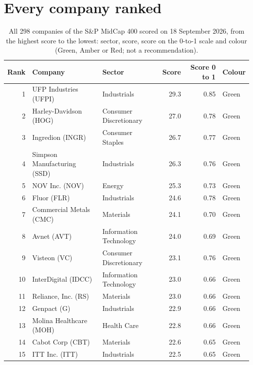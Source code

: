 \documentclass[11pt,a4paper]{article}
\begin{document}
\section{Every company ranked}
\label{app:ranking}
{\small
\begin{longtable}{r p{4.6cm} p{3cm} r r l}
\caption{All 298 companies of the S\&P MidCap 400 scored on 18 September 2026, from the highest score to the lowest: sector, score, score on the 0-to-1 scale and colour (Green, Amber or Red; not a recommendation).}\label{tab:ranking}\\
\hline
Rank & Company & Sector & Score & Score 0 to 1 & Colour \\
\hline
\endhead
1 & UFP Industries (UFPI) & Industrials & 29.3 & 0.85 & \cellcolor[HTML]{C6EFCE}Green \\
2 & Harley-Davidson (HOG) & Consumer Discretionary & 27.0 & 0.78 & \cellcolor[HTML]{C6EFCE}Green \\
3 & Ingredion (INGR) & Consumer Staples & 26.7 & 0.77 & \cellcolor[HTML]{C6EFCE}Green \\
4 & Simpson Manufacturing (SSD) & Industrials & 26.3 & 0.76 & \cellcolor[HTML]{C6EFCE}Green \\
5 & NOV Inc. (NOV) & Energy & 25.3 & 0.73 & \cellcolor[HTML]{C6EFCE}Green \\
6 & Fluor (FLR) & Industrials & 24.6 & 0.78 & \cellcolor[HTML]{C6EFCE}Green \\
7 & Commercial Metals (CMC) & Materials & 24.1 & 0.70 & \cellcolor[HTML]{C6EFCE}Green \\
8 & Avnet (AVT) & Information Technology & 24.0 & 0.69 & \cellcolor[HTML]{C6EFCE}Green \\
9 & Visteon (VC) & Consumer Discretionary & 23.1 & 0.76 & \cellcolor[HTML]{C6EFCE}Green \\
10 & InterDigital (IDCC) & Information Technology & 23.0 & 0.66 & \cellcolor[HTML]{C6EFCE}Green \\
11 & Reliance, Inc. (RS) & Materials & 23.0 & 0.66 & \cellcolor[HTML]{C6EFCE}Green \\
12 & Genpact (G) & Industrials & 22.9 & 0.66 & \cellcolor[HTML]{C6EFCE}Green \\
13 & Molina Healthcare (MOH) & Health Care & 22.8 & 0.66 & \cellcolor[HTML]{C6EFCE}Green \\
14 & Cabot Corp (CBT) & Materials & 22.6 & 0.65 & \cellcolor[HTML]{C6EFCE}Green \\
15 & ITT Inc. (ITT) & Industrials & 22.5 & 0.65 & \cellcolor[HTML]{C6EFCE}Green \\

\end{longtable}}
\end{document}
